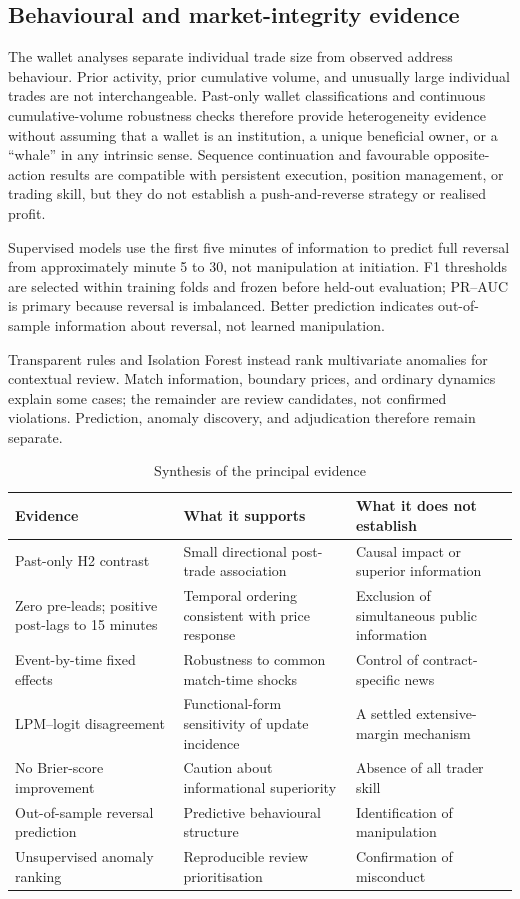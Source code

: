 \subsection{Behavioural and market-integrity evidence}
\label{sec:discussion-integrity}

The wallet analyses separate individual trade size from observed address behaviour. Prior activity, prior cumulative volume, and unusually large individual trades are not interchangeable. Past-only wallet classifications and continuous cumulative-volume robustness checks therefore provide heterogeneity evidence without assuming that a wallet is an institution, a unique beneficial owner, or a ``whale'' in any intrinsic sense. Sequence continuation and favourable opposite-action results are compatible with persistent execution, position management, or trading skill, but they do not establish a push-and-reverse strategy or realised profit.

Supervised models use the first five minutes of information to predict full reversal from approximately minute 5 to 30, not manipulation at initiation. F1 thresholds are selected within training folds and frozen before held-out evaluation; PR--AUC is primary because reversal is imbalanced. Better prediction indicates out-of-sample information about reversal, not learned manipulation.

Transparent rules and Isolation Forest instead rank multivariate anomalies for contextual review. Match information, boundary prices, and ordinary dynamics explain some cases; the remainder are review candidates, not confirmed violations. Prediction, anomaly discovery, and adjudication therefore remain separate.

\begin{table}[htbp]
\centering
\caption{Synthesis of the principal evidence}
\label{tab:channel-synthesis}
\small
\begin{tabular}{p{}p{}p{}}
\toprule
Evidence & What it supports & What it does not establish \\
\midrule
Past-only H2 contrast & Small directional post-trade association & Causal impact or superior information \\
Zero pre-leads; positive post-lags to 15 minutes & Temporal ordering consistent with price response & Exclusion of simultaneous public information \\
Event-by-time fixed effects & Robustness to common match-time shocks & Control of contract-specific news \\
LPM--logit disagreement & Functional-form sensitivity of update incidence & A settled extensive-margin mechanism \\
No Brier-score improvement & Caution about informational superiority & Absence of all trader skill \\
Out-of-sample reversal prediction & Predictive behavioural structure & Identification of manipulation \\
Unsupervised anomaly ranking & Reproducible review prioritisation & Confirmation of misconduct \\
\bottomrule
\end{tabular}
\end{table}

